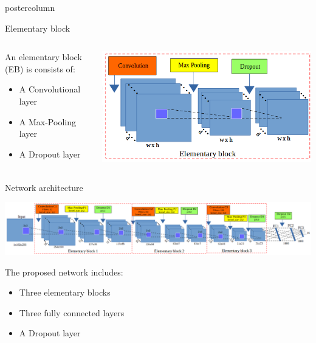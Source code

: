 \begin{frame}
\begin{columns}
\begin{column}{.49\textwidth}
\begin{beamercolorbox}[center,wd=\textwidth]{postercolumn}
\begin{minipage}[T]{.95\textwidth}
{            \begin{block}{Elementary block}
            	\begin{columns}
            		\begin{column}{.54\textwidth}
            			An elementary block (EB) is consists of:
            			\begin{itemize}
            				\item A Convolutional layer
            				\item A Max-Pooling layer
            				\item A Dropout layer
            			\end{itemize}
            		\end{column}
            		\begin{column}{.45\textwidth}
            			\centering
            			\includegraphics[width=.97\textwidth]{images/elementary_block.png}
            		\end{column}
            	\end{columns}
            \end{block}
            
            \vfill
            
            \begin{block}{Network architecture}
            	\begin{center}
            		\includegraphics[width=.96\textwidth]{images/net3.png}\\
            	\end{center}
            The proposed network includes:
            \begin{itemize}
            	\item Three elementary blocks
            	\item Three fully connected layers
            	\item A Dropout layer
            \end{itemize}
            \end{block}
  
}
\end{minipage}
\end{beamercolorbox}
\end{column}
\end{columns}
\end{frame}
